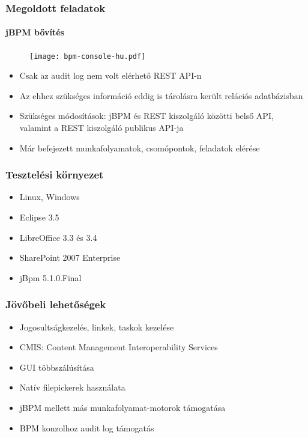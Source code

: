 \documentclass{beamer}
\begin{document}
\begin{frame}
\frametitle{Megoldott feladatok}
\framesubtitle{jBPM bővítés}
\begin{figure}[H]
\texttt{[image: bpm-console-hu.pdf]}
\end{figure}
\begin{itemize}
\item Csak az audit log nem volt elérhető REST API-n
\item Az ehhez szükséges információ eddig is tárolásra került relációs adatbázisban
\item Szükséges módosítások: jBPM és REST kiszolgáló közötti belső API, valamint a REST kiszolgáló publikus API-ja
\item Már befejezett munkafolyamatok, csomópontok, feladatok elérése
\end{itemize}
\end{frame}

\begin{frame}
\frametitle{Tesztelési környezet}

\begin{itemize}
\item Linux, Windows
\item Eclipse 3.5
\item LibreOffice 3.3 és 3.4
\item SharePoint 2007 Enterprise
\item jBpm 5.1.0.Final
\end{itemize}

\end{frame}

\begin{frame}
\frametitle{Jövőbeli lehetőségek}
\begin{itemize}
\item Jogosultságkezelés, linkek, taskok kezelése
\item CMIS: Content Management Interoperability Services
\item GUI többszálúsítása
\item Natív filepickerek használata
\item jBPM mellett más munkafolyamat-motorok támogatása
\item BPM konzolhoz audit log támogatás
\end{itemize}
\end{frame}
\end{document}
